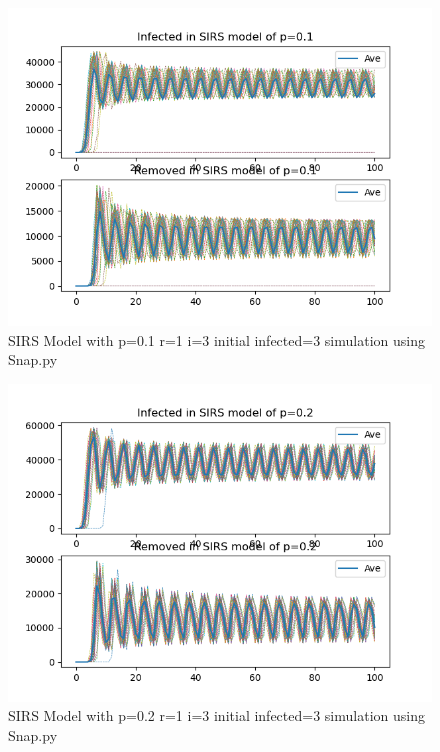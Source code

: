\documentclass{subfile}
\begin{document}
  \begin{figure}
  \includegraphics[scale=0.8]{sirsp01r1i3s3}
  \caption[SIRS p=0.1,r=1,i=3,init infected=3]{SIRS Model with p=0.1 r=1 i=3 initial infected=3 simulation using Snap.py}
  \end{figure}
  \begin{figure}
  \includegraphics[scale=0.8]{sirsp02r1i3s3}
  \caption[SIRS p=0.2,r=1,i=3,init infected=3]{SIRS Model with p=0.2 r=1 i=3 initial infected=3 simulation using Snap.py}
  \end{figure}
\end{document}
